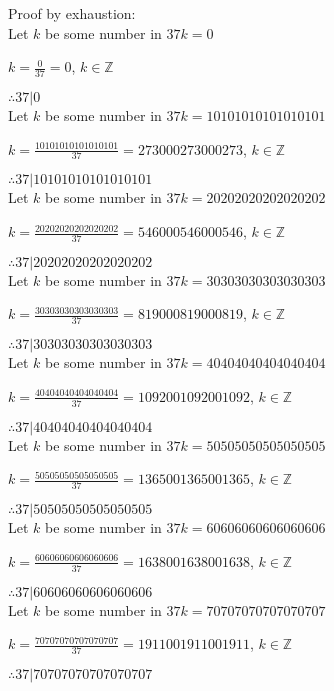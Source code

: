 \documentclass{article}
\begin{document}
Proof by exhaustion: \\

Let $k$ be some number in $37k = 0$

$k = \frac{0}{37} = 0$, $k \in \mathbb{Z}$

$ \therefore  37|0 $ \\

Let $k$ be some number in $37k = 10101010101010101$

$k = \frac{10101010101010101}{37} = 273000273000273$, $k \in \mathbb{Z}$

$ \therefore  37|10101010101010101 $ \\

Let $k$ be some number in $37k = 20202020202020202$

$k = \frac{20202020202020202}{37} = 546000546000546$, $k \in \mathbb{Z}$

$ \therefore  37|20202020202020202 $ \\

Let $k$ be some number in $37k = 30303030303030303$

$k = \frac{30303030303030303}{37} = 819000819000819$, $k \in \mathbb{Z}$

$ \therefore  37|30303030303030303 $ \\

Let $k$ be some number in $37k = 40404040404040404$

$k = \frac{40404040404040404}{37} = 1092001092001092$, $k \in \mathbb{Z}$

$ \therefore  37|40404040404040404 $ \\

Let $k$ be some number in $37k = 50505050505050505$

$k = \frac{50505050505050505}{37} = 1365001365001365$, $k \in \mathbb{Z}$

$ \therefore  37|50505050505050505 $ \\

Let $k$ be some number in $37k = 60606060606060606$

$k = \frac{60606060606060606}{37} = 1638001638001638$, $k \in \mathbb{Z}$

$ \therefore  37|60606060606060606 $ \\

Let $k$ be some number in $37k = 70707070707070707$

$k = \frac{70707070707070707}{37} = 1911001911001911$, $k \in \mathbb{Z}$

$ \therefore  37|70707070707070707 $ \\
\end{document}
